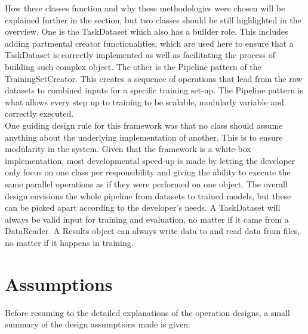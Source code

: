 How these classes function and why these methodologies were chosen will be explained further in the section, but two classes should be still highlighted in the overview. One is the TaskDataset which also has a builder role. This includes adding partmental creator functionalities, which are used here to ensure that a TaskDataset is correctly implemented as well as facilitating the process of building such complex object. The other is the Pipeline pattern of the TrainingSetCreator. This creates a sequence of operations that lead from the raw datasets to combined inputs for a specific training set-up. The Pipeline pattern is what allows every step up to training to be scalable, modularly variable and correctly executed. \\

One guiding design rule for this framework was that no class should assume anything about the underlying implementation of another. This is to ensure modularity in the system. Given that the framework is a white-box implementation, most developmental speed-up is made by letting the developer only focus on one class per responsibility and giving the ability to execute the same parallel operations as if they were performed on one object. The overall design envisions the whole pipeline from datasets to trained models, but these can be picked apart according to the developer's needs. A TaskDataset will always be valid input for training and evaluation, no matter if it came from a DataReader. A Results object can always write data to and read data from files, no matter if it happens in training. \\


\section{Assumptions} \label{Design:Assumptions}

Before resuming to the detailed explanations of the operation designs, a small summary of the design assumptions made is given:

